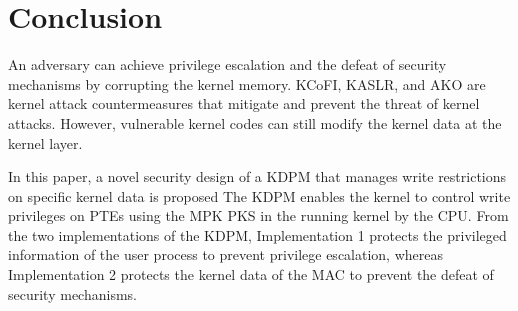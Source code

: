 \section{Conclusion}  \label{section:conclustion}
%

An adversary can achieve privilege escalation and the defeat of security
mechanisms by corrupting the kernel memory.
%
KCoFI, KASLR, and AKO are kernel attack countermeasures that mitigate and
prevent the threat of kernel attacks.
%
However, vulnerable kernel codes can still modify the kernel data at the kernel layer.

%
In this paper, a novel security design of a KDPM that manages write
restrictions on specific kernel data is proposed
The KDPM enables the kernel to control write privileges on PTEs using the MPK PKS
in the running kernel by the CPU.
%
%
%
From the two implementations of the KDPM, Implementation 1 protects the
privileged information of the user process to prevent privilege escalation,
whereas Implementation 2 protects the kernel data of the MAC to prevent the
defeat of security mechanisms.

